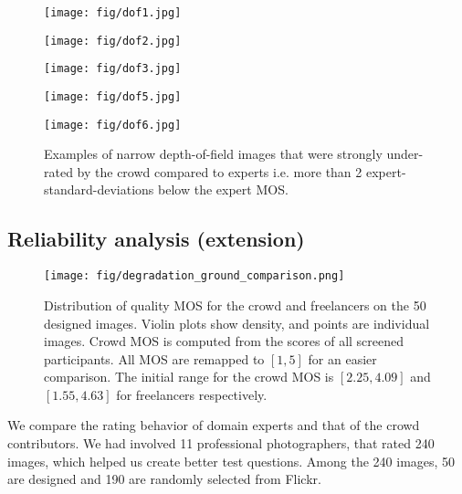 \documentclass{article}
\begin{document}
\begin{figure*}[!ht]
\centering
\begin{minipage}{0.19\linewidth}
\centerline{\texttt{[image: fig/dof1.jpg]}}
\end{minipage}
\begin{minipage}{0.19\linewidth}
\centerline{\texttt{[image: fig/dof2.jpg]}}
\end{minipage}
\begin{minipage}{0.19\linewidth}
\centerline{\texttt{[image: fig/dof3.jpg]}}
\end{minipage}
\begin{minipage}{0.19\linewidth}
\centerline{\texttt{[image: fig/dof5.jpg]}}
\end{minipage}
\begin{minipage}{0.19\linewidth}
\centerline{\texttt{[image: fig/dof6.jpg]}}
\end{minipage}
\caption{Examples of narrow depth-of-field images that were strongly under-rated by the crowd compared to experts i.e. more than 2 expert-standard-deviations below the expert MOS.}
\label{fig:depth_of_field_images}
\end{figure*}



\subsection{Reliability analysis (extension)}
\label{sec:reliability_extension}

\begin{figure*}[!hb]
\centering
\texttt{[image: fig/degradation\_ground\_comparison.png]}
\caption{Distribution of quality MOS for the crowd and freelancers on the 50 designed images. Violin plots show density, and points are individual images. Crowd MOS is computed from the scores of all screened participants. All MOS are remapped to $[1,5]$ for an easier comparison. The initial range for the crowd MOS is $[2.25,4.09]$ and $[1.55,4.63]$ for freelancers respectively.}
\label{fig:ground_comparison}
\end{figure*} 

We compare the rating behavior of domain experts and that of the crowd contributors. We had involved 11 professional photographers, that rated 240 images, which helped us create better test questions. Among the 240 images, 50 are designed and 190 are randomly selected from Flickr. 
\end{document}

